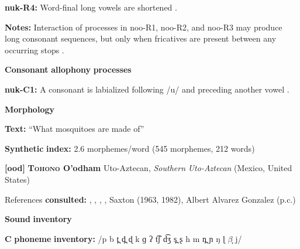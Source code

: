 \documentclass[output=paper]{langsci/langscibook}
\begin{document}
\begin{styleBody}
\textbf{nuk-R4:} Word-final long vowels are shortened \citep[27]{Rose1981}.
\end{styleBody}

\begin{styleBody}
\textbf{Notes:} Interaction of processes in noo-R1, noo-R2, and noo-R3 may produce long consonant sequences, but only when fricatives are present between any occurring stops \citep[26]{Rose1981}.
\end{styleBody}

\begin{styleBody}
\textbf{Consonant} \textbf{allophony} \textbf{processes}
\end{styleBody}

\begin{styleBody}
\textbf{nuk-C1:} A consonant is labialized following /u/ and preceding another vowel \citep[27]{Stonham1999}.
\end{styleBody}

\begin{styleBody}
\textbf{Morphology}
\end{styleBody}

\begin{styleBody}
\textbf{Text:} “What mosquitoes are made of” \citep[133-143]{Stonham1999}
\end{styleBody}

\begin{styleBody}
\textbf{Synthetic} \textbf{index:} 2.6 morphemes/word (545 morphemes, 212 words)
\end{styleBody}

\begin{styleBody}
\textbf{[ood]}   \textbf{\textsc{Tohono} \textbf{O’odham}}  Uto-Aztecan, \textit{Southern} \textit{Uto-Aztecan} (Mexico, United States)
\end{styleBody}

\begin{styleBody}
References \textbf{consulted:} \citet{DoloresMathiot1991}, \citet{Fitzgerald1994}, \citet{Hale1959}, \citet{HillZepeda1992}, Saxton (1963, 1982), Albert Alvarez Gonzalez (p.c.)
\end{styleBody}

\begin{styleBody}
\textbf{Sound} \textbf{inventory}
\end{styleBody}

\begin{styleBody}
\textbf{C} \textbf{phoneme} \textbf{inventory:} /p b t̪ d̪ ɖ k ɡ ʔ t͡ʃ d͡ʒ s̪ ʂ h m n̪ ɲ ŋ ɭ $\beta ̞$ j/
\end{styleBody}
\end{document}
